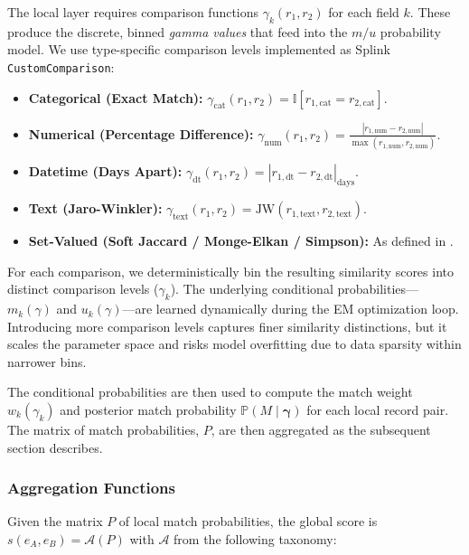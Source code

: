 The local \fellegisunter{} layer requires comparison functions $\gamma_k(r_1, r_2)$ for each field $k$. These produce the discrete, binned \textit{gamma values} that feed into the $m/u$ probability model. We use type-specific comparison levels implemented as Splink \texttt{CustomComparison}:
\begin{itemize}
	\item \textbf{Categorical (Exact Match):} $\gamma_{\text{cat}}(r_1, r_2) = \mathbb{I}[r_{1,\text{cat}} = r_{2,\text{cat}}]$.

	\item \textbf{Numerical (Percentage Difference):} $\gamma_{\text{num}}(r_1, r_2) = \frac{|r_{1,\text{num}} - r_{2,\text{num}}|}{\max(r_{1,\text{num}}, r_{2,\text{num}})}$.

	\item \textbf{Datetime (Days Apart):} $\gamma_{\text{dt}}(r_1, r_2) = |r_{1,\text{dt}} - r_{2,\text{dt}}|_{\text{days}}$.

	\item \textbf{Text (Jaro-Winkler):} $\gamma_{\text{text}}(r_1, r_2) = \text{JW}(r_{1,\text{text}}, r_{2,\text{text}})$.

	\item \textbf{Set-Valued (Soft Jaccard / Monge-Elkan / Simpson):} As defined in .
\end{itemize}

For each comparison, we deterministically bin the resulting similarity scores into distinct comparison levels ($\gamma_k$). The underlying conditional probabilities—$m_k(\gamma)$ and $u_k(\gamma)$—are learned dynamically during the EM optimization loop. Introducing more comparison levels captures finer similarity distinctions, but it scales the parameter space and risks model overfitting due to data sparsity within narrower bins.

The conditional probabilities are then used to compute the match weight $w_k(\gamma_k)$ and posterior match probability $\mathbb{P}(M \mid \boldsymbol{\gamma})$ for each local record pair. The matrix of match probabilities, $P$, are then aggregated as the subsequent section describes.

\subsubsection{Aggregation Functions}
\label{sec:aggregation_functions}

Given the matrix $P$ of local match probabilities, the global score is $s(e_A, e_B) = \mathcal{A}(P)$ with $\mathcal{A}$ from the following taxonomy:

